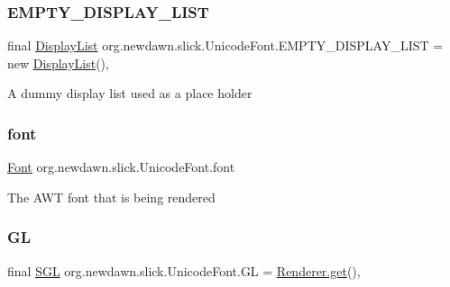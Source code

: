 \subsubsection{\texorpdfstring{E\+M\+P\+T\+Y\+\_\+\+D\+I\+S\+P\+L\+A\+Y\+\_\+\+L\+I\+ST}{EMPTY\_DISPLAY\_LIST}}
{\footnotesize\ttfamily final \mbox{\hyperlink{classorg_1_1newdawn_1_1slick_1_1_unicode_font_1_1_display_list}{Display\+List}} org.\+newdawn.\+slick.\+Unicode\+Font.\+E\+M\+P\+T\+Y\+\_\+\+D\+I\+S\+P\+L\+A\+Y\+\_\+\+L\+I\+ST = new \mbox{\hyperlink{classorg_1_1newdawn_1_1slick_1_1_unicode_font_1_1_display_list}{Display\+List}}()\hspace{0.3cm}{\ttfamily [static]}, {\ttfamily [private]}}

A dummy display list used as a place holder \mbox{\label{classorg_1_1newdawn_1_1slick_1_1_unicode_font_a956ab491839be375d47444a67ebff11c}} 
\subsubsection{\texorpdfstring{font}{font}}
{\footnotesize\ttfamily \mbox{\hyperlink{interfaceorg_1_1newdawn_1_1slick_1_1_font}{Font}} org.\+newdawn.\+slick.\+Unicode\+Font.\+font\hspace{0.3cm}{\ttfamily [private]}}

The A\+WT font that is being rendered \mbox{\label{classorg_1_1newdawn_1_1slick_1_1_unicode_font_a00797c33470cfc4443b6c24d7a48c2b1}} 
\subsubsection{\texorpdfstring{GL}{GL}}
{\footnotesize\ttfamily final \mbox{\hyperlink{interfaceorg_1_1newdawn_1_1slick_1_1opengl_1_1renderer_1_1_s_g_l}{S\+GL}} org.\+newdawn.\+slick.\+Unicode\+Font.\+GL = \mbox{\hyperlink{classorg_1_1newdawn_1_1slick_1_1opengl_1_1renderer_1_1_renderer_abe742c3a7dfca67c6c01821d27087308}{Renderer.\+get}}()\hspace{0.3cm}{\ttfamily [static]}, {\ttfamily [private]}}

